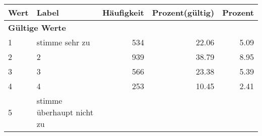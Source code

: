      \begin{longtable}{lXrrr}
     \toprule
     \textbf{Wert} & \textbf{Label} & \textbf{Häufigkeit} & \textbf{Prozent(gültig)} & \textbf{Prozent} \\
     \endhead
     \midrule
     \multicolumn{5}{l}{\textbf{Gültige Werte}}\\

     1 &
     \multicolumn{1}{X}{ stimme sehr zu   } &


       \num{534} &
       \num[round-mode=places,round-precision=2]{22.06} &
         \num[round-mode=places,round-precision=2]{5.09} \\

     2 &
     \multicolumn{1}{X}{ 2   } &


       \num{939} &
       \num[round-mode=places,round-precision=2]{38.79} &
         \num[round-mode=places,round-precision=2]{8.95} \\

     3 &
     \multicolumn{1}{X}{ 3   } &


       \num{566} &
       \num[round-mode=places,round-precision=2]{23.38} &
         \num[round-mode=places,round-precision=2]{5.39} \\

     4 &
     \multicolumn{1}{X}{ 4   } &


       \num{253} &
       \num[round-mode=places,round-precision=2]{10.45} &
         \num[round-mode=places,round-precision=2]{2.41} \\

     5 &
     \multicolumn{1}{X}{ stimme überhaupt nicht zu   } &



\end{longtable}
